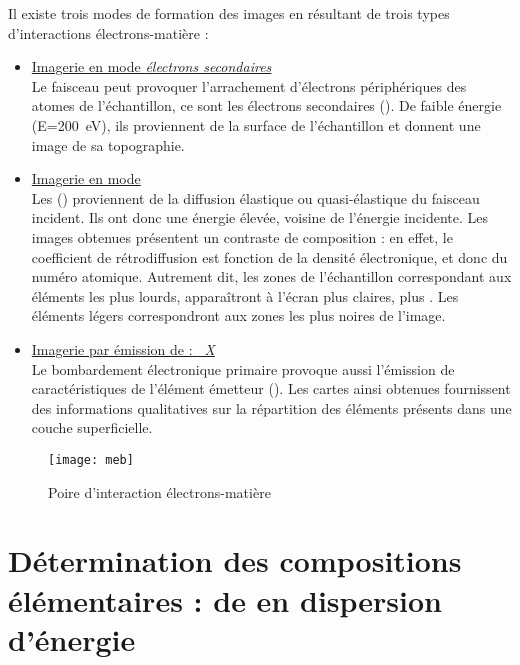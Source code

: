 Il existe trois modes de formation des images en \MEB[ie] résultant 
de trois types d'interactions électrons-matière :

\begin{itemize}
  \item \uline{Imagerie en mode \emph{électrons secondaires}}\\
        Le faisceau peut provoquer l'arrachement d'électrons 
        périphériques des atomes de l'échantillon, ce sont les 
        électrons secondaires (). De faible énergie 
        (E=\SI{200}{\electronvolt}), ils proviennent de la surface 
        de l'échantillon et donnent une image de sa topographie. 
  \item \uline{Imagerie en mode \emph{\ERD}}\\ 
        Les \ERD () proviennent de la diffusion 
        élastique ou quasi-élastique du faisceau incident. Ils ont 
        donc une énergie élevée, voisine de l'énergie incidente. 
        Les images obtenues présentent un contraste de composition : 
        en effet, le coefficient de rétrodiffusion est fonction de 
        la densité électronique, et donc du numéro atomique. 
        Autrement dit, les zones de l'échantillon correspondant aux 
        éléments les plus lourds, apparaîtront à l'écran plus claires, 
        plus . Les éléments légers correspondront 
        aux zones les plus noires de l'image.
  \item \uline{Imagerie par émission de \RX : \emph{\carto~X}}\\
        Le bombardement électronique primaire provoque aussi 
        l'émission de \RX caractéristiques de l'élément émetteur 
        (). Les cartes ainsi obtenues fournissent des 
        informations qualitatives sur la répartition des éléments 
        présents dans une couche superficielle.
\end{itemize}

\begin{figure}[htb]
  \texttt{[image: meb]}
  \caption[Poire d'interaction électrons-matière]
          {Poire d'interaction électrons-matière \autocite{web_MEB}}
  \label{fig:meb}
\end{figure}

\section{Détermination des compositions élémentaires : \spectro de 
         \RX en dispersion d'énergie}

